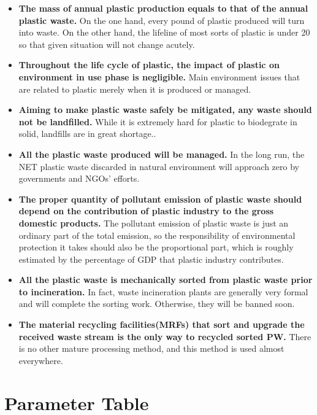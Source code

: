 \documentclass{mcmthesis}
\begin{document}
\begin{itemize}
	
	\item \textbf{The mass of annual plastic production equals to that of the annual plastic waste.} On the one hand, every pound of plastic produced will turn into waste. On the other hand, the lifeline of most sorts of plastic is under 20 so that given situation will not change acutely\cite{Geyer}.
	
	\item \textbf{Throughout the life cycle of plastic, the impact of plastic on environment in use phase is negligible.} Main environment issues that are related to plastic merely when it is produced or managed\cite{book}.
	
	\item \textbf{Aiming to make plastic waste safely be mitigated, any waste should not be landfilled.} While it is extremely hard for plastic to biodegrate in solid, landfills are in great shortage.\cite{book}.
	
	\item \textbf{All the plastic waste produced will be managed.} In the long run, the NET plastic waste discarded in natural environment will approach zero by governments and NGOs’ efforts.
	
	\item \textbf{The proper quantity of pollutant emission of plastic waste should depend on the contribution of plastic industry to the gross domestic products.} The pollutant emission of plastic waste is just an ordinary part of the total emission, so the responsibility of environmental protection it takes should also be the proportional part, which is roughly estimated by the percentage of GDP that plastic industry contributes.
	
	\item \textbf{All the plastic waste is mechanically sorted from plastic waste prior to incineration.} In fact, waste incineration plants are generally very formal and will complete the sorting work. Otherwise, they will be banned soon.
	
	\item \textbf{The material recycling facilities(MRFs) that sort and upgrade the received waste stream is the only way to recycled sorted PW.} There is no other mature processing method, and this method is used almost everywhere.
	
\end{itemize}

\section{Parameter Table}
\end{document}
